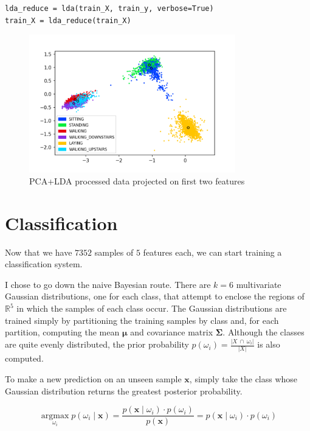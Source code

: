 \documentclass[14pt]{extarticle}
\begin{document}
    \begin{verbatim}
lda_reduce = lda(train_X, train_y, verbose=True)
train_X = lda_reduce(train_X)
    \end{verbatim}

    \begin{figure}[H]
        \centering
        \includegraphics[width=0.8\textwidth]{img/lda_1.png}
        \caption{PCA+LDA processed data projected on first two features}
    \end{figure}

    \section{Classification}
    Now that we have $7352$ samples of $5$ features each, we can start training
    a classification system.

    I chose to go down the naive Bayesian route. There are $k=6$ multivariate
    Gaussian distributions, one for each class, that attempt to enclose the
    regions of $\mathbb{R}^5$ in which the samples of each class occur. The
    Gaussian distributions are trained simply by partitioning the training
    samples by class and, for each partition, computing the mean $\boldsymbol{\mu}$ and
    covariance matrix $\boldsymbol{\Sigma}$. Although the classes are quite
    evenly distributed, the prior probability $p(\omega_i)=\frac{|X\ \cap\ \omega_i|}{|X|}$
    is also computed.

    To make a new prediction on an unseen sample $\boldsymbol{x}$, simply take
    the class whose Gaussian distribution returns the greatest posterior probability.

    \[
      \operatorname*{argmax}_{\omega_i} p(\omega_i\mid\boldsymbol{x}) =
      \frac{p(\boldsymbol{x}\mid\omega_i)\cdot p(\omega_i)}{p(\boldsymbol{x})} =
      p(\boldsymbol{x}\mid\omega_i)\cdot p(\omega_i)
    \]
\end{document}

